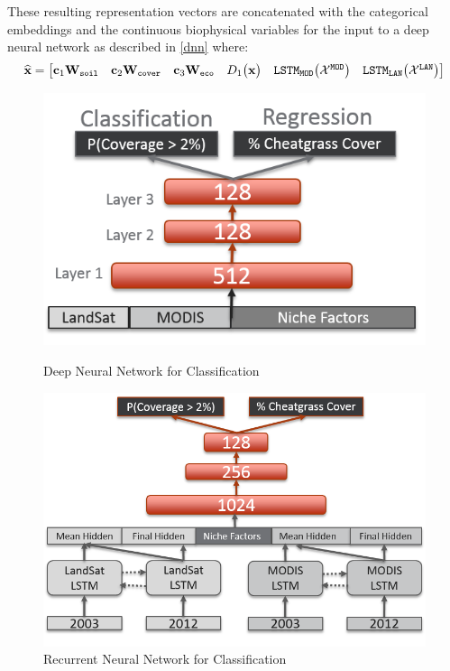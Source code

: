 \def\year{2017}\relax \documentclass[letterpaper]{article}
\begin{document}
These resulting representation vectors are concatenated with the categorical embeddings and the continuous biophysical variables for the input to a deep neural network as described in \ref{dnn} where:
\begin{equation}
\widehat{{\bf x}} = \begin{bmatrix}{\bf c}_1{\bf W}_{\texttt{soil}}&{\bf c}_2{\bf W}_{\texttt{cover}}&{\bf c}_3{\bf W}_{\texttt{eco}}&D_1 \bigl({\bf x}\bigr) &\texttt{LSTM}_{\texttt{MOD}}\bigl(\mathcal{X}^{\texttt{MOD}}\bigr)&\texttt{LSTM}_{\texttt{LAN}}\bigl(\mathcal{X}^{\texttt{LAN}}\bigr)\end{bmatrix}
\end{equation}

\begin{figure}
\centering
\begin{minipage}{.48\textwidth}
  \centering
\includegraphics[width=\textwidth]{pics/dnn.png}
\caption{Deep Neural Network for Classification}\label{fig:dnn}
\end{minipage}
\begin{minipage}{.04\textwidth}
\end{minipage}
\begin{minipage}{.48\textwidth}
  \centering
\includegraphics[width=\textwidth]{pics/rnn.png}
\caption{Recurrent Neural Network for Classification}\label{fig:rnn}
\end{minipage}
\end{figure}
\end{document}
